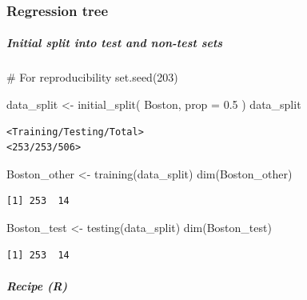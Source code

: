\documentclass[
]{article}
\let\oldsubparagraph\subparagraph
\renewcommand{\subparagraph}[1]{\oldsubparagraph{#1}\mbox{}}
\newenvironment{Shaded}{\begin{snugshade}}{\end{snugshade}}
\newcommand{\AttributeTok}[1]{\textcolor[rgb]{0.40,0.45,0.13}{#1}}
\newcommand{\CommentTok}[1]{\textcolor[rgb]{0.37,0.37,0.37}{#1}}
\newcommand{\DecValTok}[1]{\textcolor[rgb]{0.68,0.00,0.00}{#1}}
\newcommand{\FloatTok}[1]{\textcolor[rgb]{0.68,0.00,0.00}{#1}}
\newcommand{\FunctionTok}[1]{\textcolor[rgb]{0.28,0.35,0.67}{#1}}
\newcommand{\NormalTok}[1]{\textcolor[rgb]{0.00,0.23,0.31}{#1}}
\newcommand{\OtherTok}[1]{\textcolor[rgb]{0.00,0.23,0.31}{#1}}
\begin{document}
\hypertarget{regression-tree}{%
\subsubsection{Regression tree}\label{regression-tree}}

\hypertarget{initial-split-into-test-and-non-test-sets}{%
\subparagraph{Initial split into test and non-test
sets}\label{initial-split-into-test-and-non-test-sets}}

\begin{Shaded}
\begin{Highlighting}[]
\CommentTok{\# For reproducibility}
\FunctionTok{set.seed}\NormalTok{(}\DecValTok{203}\NormalTok{)}

\NormalTok{data\_split }\OtherTok{\textless{}{-}} \FunctionTok{initial\_split}\NormalTok{(}
\NormalTok{  Boston, }
  \AttributeTok{prop =} \FloatTok{0.5}
\NormalTok{  )}
\NormalTok{data\_split}
\end{Highlighting}
\end{Shaded}

\begin{verbatim}
<Training/Testing/Total>
<253/253/506>
\end{verbatim}

\begin{Shaded}
\begin{Highlighting}[]
\NormalTok{Boston\_other }\OtherTok{\textless{}{-}} \FunctionTok{training}\NormalTok{(data\_split)}
\FunctionTok{dim}\NormalTok{(Boston\_other)}
\end{Highlighting}
\end{Shaded}

\begin{verbatim}
[1] 253  14
\end{verbatim}

\begin{Shaded}
\begin{Highlighting}[]
\NormalTok{Boston\_test }\OtherTok{\textless{}{-}} \FunctionTok{testing}\NormalTok{(data\_split)}
\FunctionTok{dim}\NormalTok{(Boston\_test)}
\end{Highlighting}
\end{Shaded}

\begin{verbatim}
[1] 253  14
\end{verbatim}

\hypertarget{recipe-r}{%
\subparagraph{Recipe (R)}\label{recipe-r}}
\end{document}

